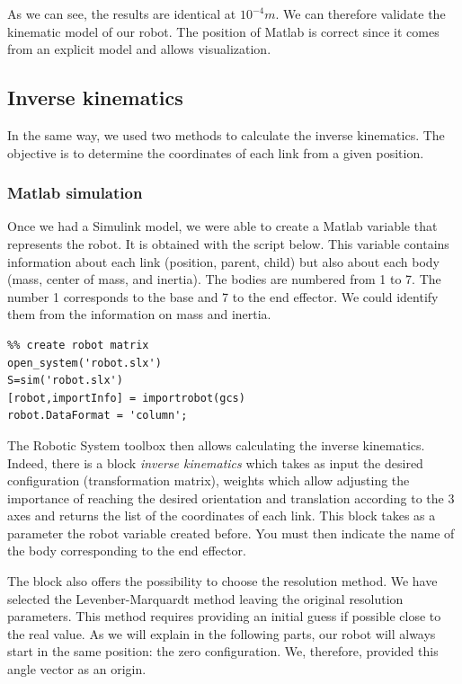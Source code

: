 \bigbreak
As we can see, the results are identical at $10^{-4}m$. We can therefore validate the kinematic model of our robot. The position of Matlab is correct since it comes from an explicit model and allows visualization.

\subsection{Inverse kinematics}

In the same way, we used two methods to calculate the inverse kinematics. The objective is to determine the coordinates of each link from a given position.

\subsubsection{Matlab simulation}

Once we had a Simulink model, we were able to create a Matlab variable that represents the robot. It is obtained with the script below.  This variable contains information about each link (position, parent, child) but also about each body (mass, center of mass, and inertia). The bodies are numbered from 1 to 7. The number 1 corresponds to the base and 7 to the end effector. We could identify them from the information on mass and inertia.

\begin{verbatim}
%% create robot matrix
open_system('robot.slx')
S=sim('robot.slx')
[robot,importInfo] = importrobot(gcs)
robot.DataFormat = 'column';
\end{verbatim}

\bigbreak
The Robotic System toolbox then allows calculating the inverse kinematics. Indeed, there is a block \textit{inverse kinematics} which takes as input the desired configuration (transformation matrix), weights which allow adjusting the importance of reaching the desired orientation and translation according to the 3 axes and returns the list of the coordinates of each link. This block takes as a parameter the robot variable created before. You must then indicate the name of the body corresponding to the end effector.

\bigbreak
The block also offers the possibility to choose the resolution method. We have selected the Levenber-Marquardt method leaving the original resolution parameters. This method requires providing an initial guess if possible close to the real value. As we will explain in the following parts, our robot will always start in the same position: the zero configuration. We, therefore, provided this angle vector as an origin.

